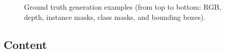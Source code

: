 \begin{figure}[!htb]
    \centering
    \caption{Ground truth generation examples (from top to bottom: RGB, depth, instance masks, class masks, and bounding boxes).}
    \label{fig:ground_truth}
  \end{figure}

\subsection{Content}

